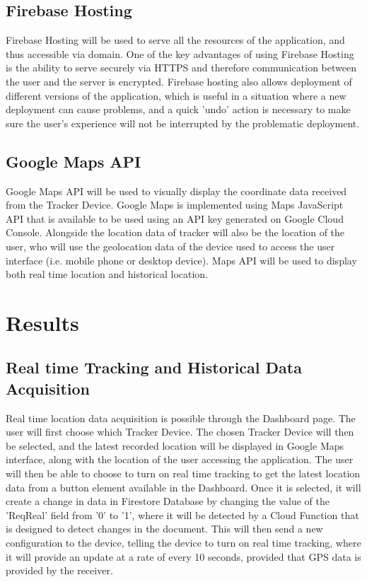 \documentclass[conference]{IEEEtran}
\begin{document}
\subsection{Firebase Hosting}
Firebase Hosting will be used to serve all the resources of the application, and thus accessible via domain. One of the key advantages of using Firebase Hosting is the ability to serve securely via HTTPS and therefore communication between the user and the server is encrypted. Firebase hosting also allows deployment of different versions of the application, which is useful in a situation where a new deployment can cause problems, and a quick 'undo' action is necessary to make sure the user's experience will not be interrupted by the problematic deployment.

\subsection{Google Maps API}
Google Maps API will be used to visually display the coordinate data received from the Tracker Device. Google Maps is implemented using Maps JavaScript API that is available to be used using an API key generated on Google Cloud Console. Alongside the location data of tracker will also be the location of the user, who will use the geolocation data of the device used to access the user interface (i.e. mobile phone or desktop device). Maps API will be used to display both real time location and historical location.

\section{Results}
\subsection{Real time Tracking and Historical Data Acquisition}
Real time location data acquisition is possible through the Dashboard page. The user will first choose which Tracker Device. The chosen Tracker Device will then be selected, and the latest recorded location will be displayed in Google Maps interface, along with the location of the user accessing the application. The user will then be able to choose to turn on real time tracking to get the latest location data from a button element available in the Dashboard. Once it is selected, it will create a change in data in Firestore Database by changing the value of the 'ReqReal' field from '0' to '1', where it will be detected by a Cloud Function that is designed to detect changes in the document. 
This will then send a new configuration to the device, telling the device to turn on real time tracking, where it will provide an update at a rate of every 10 seconds, provided that GPS data is provided by the receiver.
\end{document}

